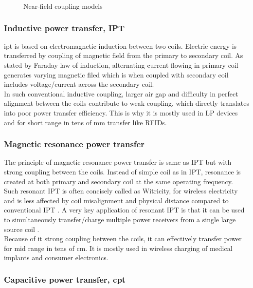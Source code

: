 \documentclass[12pt,a4paper,UKenglish]{report}
\begin{document}
\begin{figure} [htbp]
 	\caption{Near-field coupling models} 
	\label{visio_model_near} 
\end{figure}

\subsubsection{Inductive power transfer, IPT}

\acrshort{ipt} is based on electromagnetic induction between two coils. Electric energy is transferred by coupling of 
magnetic field from the primary to secondary coil. As stated by Faraday law of induction, alternating current 
flowing in primary coil generates varying magnetic filed which is when coupled with secondary coil includes 
voltage/current across the secondary coil. \\

In such conventional inductive coupling, larger air gap and difficulty in perfect alignment between the coils 
contribute to weak coupling, which directly translates into poor power transfer efficiency. This is why it is 
mostly used in LP devices and for short range in tens of mm transfer like RFIDs. \\

\subsubsection{Magnetic resonance power transfer}

The principle of magnetic resonance power transfer is same as IPT but with strong coupling between the coils. 
Instead of simple coil as in IPT, resonance is created at both primary and secondary coil at the same operating 
frequency. Such resonant IPT is often concisely called as  Witricity, for wireless electricity and is less 
affected by coil misalignment and physical distance compared to conventional IPT  \cite{wpt_witricity}. A very 
key application of resonant IPT is that it can be used to simultaneously transfer/charge multiple power 
receivers from a single large source coil \cite{wpt_mutliple_device_charging}. \\

Because of it strong coupling between the coils, it can effectively transfer power for mid range in tens of cm. 
It is mostly used in  wireless charging of medical implants and consumer electronics. \\

\subsubsection{Capacitive power transfer, \acrshort{cpt}}
\end{document}
